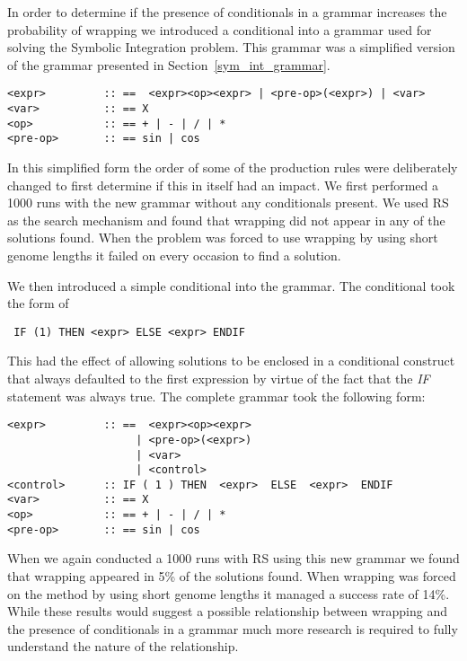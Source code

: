 In order to determine if the presence of conditionals in a grammar increases the probability of wrapping we introduced a conditional into a grammar used for solving the Symbolic Integration problem. This grammar was a simplified version of the grammar presented in Section~\ref{sym_int_grammar}. 

\small
\begin{verbatim}
<expr>         :: ==  <expr><op><expr> | <pre-op>(<expr>) | <var> 
<var>          :: == X  	                                           
<op>           :: == + | - | / | *                            
<pre-op>       :: == sin | cos         

\end{verbatim}
\normalsize  

In this simplified form the order of some of the production rules were deliberately changed to first determine if this in itself had an impact. We first performed a 1000 runs with the new grammar without any conditionals present. We used RS as the search mechanism and found that wrapping did not appear in any of the solutions found. When the problem was forced to use wrapping by using short genome lengths it failed on every occasion to find a solution.

We then introduced a simple conditional into the grammar. The conditional took the form of \begin{verbatim} IF (1) THEN <expr> ELSE <expr> ENDIF \end{verbatim}\noindent This had the effect of allowing solutions to be enclosed in a conditional construct that always defaulted to the first expression by virtue of the fact that the \emph{IF} statement was always true. The complete grammar took the following form:

\small
\begin{verbatim}
<expr>         :: ==  <expr><op><expr> 
                    | <pre-op>(<expr>)
                    | <var>
                    | <control>
<control>      :: IF ( 1 ) THEN  <expr>  ELSE  <expr>  ENDIF   
<var>          :: == X  	                                           
<op>           :: == + | - | / | *                            
<pre-op>       :: == sin | cos         

\end{verbatim}
\normalsize  
 
When we again conducted a 1000 runs with RS using this new grammar we found that wrapping appeared in 5\% of the solutions found. When wrapping was forced on the method by using short genome lengths it managed a success rate of 14\%. While these results would suggest a possible relationship between wrapping and the presence of conditionals in a grammar much more research is required to fully understand the nature of the relationship. 

